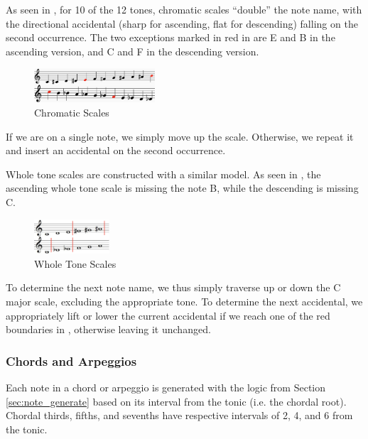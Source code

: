 \documentclass{article}
\begin{document}
As seen in , for 10 of the 12 tones, chromatic scales “double” the note name, with the directional accidental (sharp for ascending, flat for descending) falling on the second occurrence. The two exceptions marked in red in  are E and B in the ascending version, and C and F in the descending version.
\vspace{-2mm}
\begin{figure}[h!]
\centering
\includegraphics[width=0.4\textwidth]{images/chromatic}
\caption{Chromatic Scales}
\label{chromatic}
\vspace{-3mm}
\end{figure}

If we are on a single note, we simply move up the scale. Otherwise, we repeat it and insert an accidental on the second occurrence.

Whole tone scales are constructed with a similar model. As seen in , the ascending whole tone scale is missing the note B, while the descending is missing C.

\vspace{-2mm}
\begin{figure}[h!]
\centering
\includegraphics[width=0.25\textwidth]{images/whole_tone}
\caption{Whole Tone Scales}
\label{whole_tone}
\vspace{-3mm}
\end{figure}

To determine the next note name, we thus simply traverse up or down the C major scale, excluding the appropriate tone. To determine the next accidental, we appropriately lift or lower the current accidental if we reach one of the red boundaries in , otherwise leaving it unchanged.

\subsubsection{Chords and Arpeggios}
\label{sec:chord_expansion}
Each note in a chord or arpeggio is generated with the logic from Section \ref{sec:note_generate} based on its interval from the tonic (i.e. the chordal root). Chordal thirds, fifths, and sevenths have respective intervals of 2, 4, and 6 from the tonic.
\end{document}
